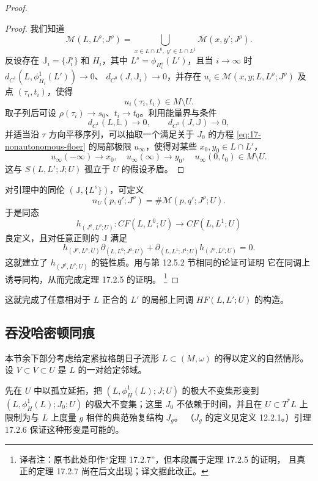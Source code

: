 \begin{proof}
\begin{proof}
我们知道
\[
 \mathcal M(L,L^\rho;J^\rho)
 =\bigcup_{x\in L\cap L^0,\ y'\in L\cap L^1}
 \overline{\mathcal M}(x,y';J^\rho).
\]
反设存在 $\mathbb J_i=\{J_i^s\}$ 和 $H_i$，其中
$L^s=\phi_{H_i^s}(L')$，且当 $i\to\infty$ 时
$d_{C^1}(L,\phi_{H_i}^1(L'))\to0$、
$d_{C^0}(J,\mathbb J_i)\to0$，并存在
$u_i\in\mathcal M(x,y;L,L^\rho;J^\rho)$ 及点 $(\tau_i,t_i)$，使得
\begin{equation}
 u_i(\tau_i,t_i)\in M\setminus U.
\label{eq:17-continuation-escapes-U}
\end{equation}
取子列后可设 $\rho(\tau_i)\to s_0$、$t_i\to t_0$。利用能量界与条件
\[
 d_{C^1}(L,\mathbb L)\to0,
 \qquad d_{C^0}(J,\mathbb J)\to0,
\]
并适当沿 $\tau$ 方向平移序列，可以抽取一个满足关于 $J_0$ 的方程
\eqref{eq:17-nonautonomous-floer} 的局部极限 $u_\infty$，使得对某些
$x_0,y_0\in L\cap L'$，
\[
 u_\infty(-\infty)\to x_0,\quad u_\infty(\infty)\to y_0,\quad
 u_\infty(0,t_0)\in M\setminus U.
\]
这与 $S(L,L';J;U)$ 孤立于 $U$ 的假设矛盾。
\end{proof}

对引理中的同伦 $(\mathbb J,\{L^s\})$，可定义
\[
 n_U(p,q';J^\rho)=\#\mathcal M(p,q';J^\rho;U).
\]
于是同态
\[
 h_{(J^\rho,L^\rho;U)}:CF(L,L^0;U)\longrightarrow CF(L,L^1;U)
\]
良定义，且对任意\personFloer{}正则的 $\mathbb J$ 满足
\[
 h_{(J^\rho,L^\rho;U)}\partial_{(L,L^0;J^0;U)}
 +\partial_{(L,L^1;J^1;U)}h_{(J^\rho,L^\rho;U)}=0.
\]
这就建立了 $h_{(J^\rho,L^\rho;U)}$ 的链性质。用与第 12.5.2 节相同的论证可证明
它在同调上诱导同构，从而完成定理 17.2.5 的证明。
\footnote{译者注：原书此处印作“定理 17.2.7”，但本段属于定理 17.2.5 的证明，
且真正的定理 17.2.7 尚在后文出现；译文据此改正。}
\end{proof}

这就完成了任意相对于 $L$ 正合的 $L'$ 的局部\personFloer{}上同调
$HF(L,L';U)$ 的构造。

\subsection{吞没哈密顿同痕}
\label{subsec:engulfed-hamiltonian-isotopy}

本节余下部分考虑给定紧拉格朗日子流形 $L\subset(M,\omega)$ 的\termLocalFloerHomology{}得以定义的自然情形。设 $V\subset\overline V\subset U$ 是 $L$ 的一对给定\personDarboux{}邻域。

先在 $U$ 中以孤立延拓，把 $(L,\phi_H^1(L);J;U)$ 的极大不变集形变到
$(L,\phi_H^1(L);J_0;U)$ 的极大不变集；这里 $J_0$ 不依赖于时间，并且在
$U\subset T^*L$ 上限制为与 $L$ 上\personRiemann{}度量 $g$ 相伴的典范殆复结构 $J_g$。
（$J_g$ 的定义见定义 12.2.1。）引理 17.2.6 保证这种形变是可能的。

